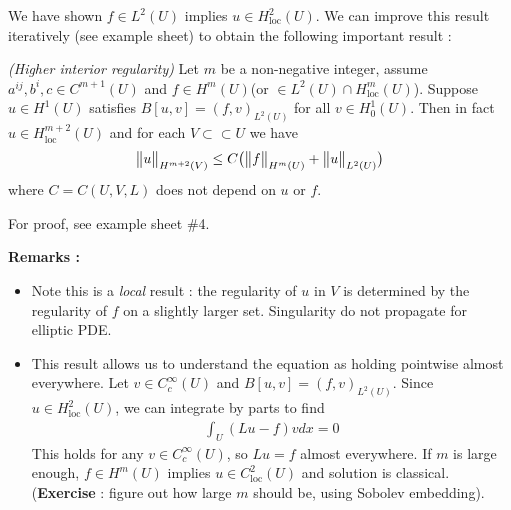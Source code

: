 \documentclass[12pt,a4paper]{report}
\newenvironment{proof}
{\begin{changemargin}{1cm}{0.5cm} 
	}%
	{\end{changemargin}
}
\begin{document}
We have shown $f\in L^2(U)$ implies $u\in H^2_{\text{loc}}(U)$. We can improve this result iteratively (see example sheet) to obtain the following important result :
\s

\thm \emph{(Higher interior regularity)} Let $m$ be a non-negative integer, assume $a^{ij},b^{i}, c\in C^{m+1}(U)$ and $f\in H^m (U)$(or $\in L^2(U)\cap H^m_{\text{loc}}(U)$). Suppose $u\in H^1(U)$ satisfies $B[u,v] = (f,v)_{L^2(U)}$ for all $v\in H_0^1(U)$. Then in fact $u\in H^{m+2}_{\text{loc}}(U)$ and for each $V\subset\subset U$ we have
\begin{align*}
\bigl\lVert u\bigr\rVert_{H^{m+2}(V)} \leq C \big( \bigl\lVert f\bigr\rVert_{H^m(U)} + \bigl\lVert u\bigr\rVert_{L^2(U)} \big)
\end{align*}
where $C= C(U,V,L)$ does not depend on $u$ or $f$.
\begin{proof}
\pf For proof, see example sheet {\#}4.
\end{proof}
\s

\textbf{Remarks :}
\begin{itemize}
\item Note this is a \emph{local} result : the regularity of $u$ in $V$ is determined by the regularity of $f$ on a slightly larger set. Singularity do not propagate for elliptic PDE.
\item This result allows us to understand the equation as holding pointwise almost everywhere. Let $v\in C_c^{\infty}(U)$ and $B[u,v] = (f,v)_{L^2(U)}$. Since $u\in H^2_{\text{loc}}(U)$, we can integrate by parts to find
\begin{align*}
\int_U (Lu -f) v dx = 0
\end{align*}
This holds for any $v\in C_c^{\infty}(U)$, so $Lu = f$ almost everywhere. If $m$ is large enough, $f\in H^m(U)$ implies $u\in C^2_{\text{loc}}(U)$ and solution is classical. (\textbf{Exercise} : figure out how large $m$ should be, using Sobolev embedding).
\end{itemize}
\s
\end{document}
